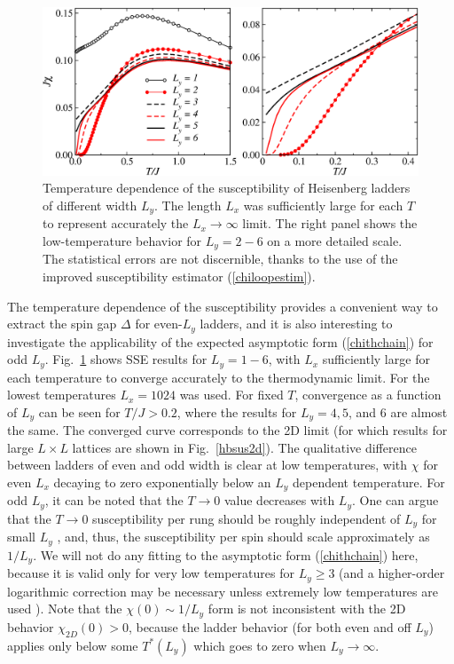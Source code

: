 \documentclass[draft,numberedheadings]{aipproc}
\begin{document}
\begin{figure}
\includegraphics[width=12.5cm, clip]{laddsusc.eps}
\caption{Temperature dependence of the susceptibility of Heisenberg ladders of different width $L_y$. The length $L_x$ was sufficiently large
for each $T$ to represent accurately the $L_x\to \infty$ limit. The right panel shows the low-temperature behavior for $L_y=2-6$ on a more
detailed scale. The statistical errors are not discernible, thanks to the use of the improved susceptibility estimator (\ref{chiloopestim}).}
\label{laddsusc}
\end{figure}

The temperature dependence of the susceptibility provides a convenient way to extract the spin gap $\Delta$ for even-$L_y$ ladders, and it is also 
interesting to investigate the applicability of the expected asymptotic form (\ref{chithchain}) for odd $L_y$. Fig.~\ref{laddsusc} shows SSE results for $L_y=1-6$, 
with $L_x$ sufficiently large for each temperature to converge accurately to the thermodynamic limit. For the lowest temperatures $L_x=1024$ was used. For fixed $T$, 
convergence as a function of $L_y$ can be seen for $T/J>0.2$, where the results for $L_y=4,5$, and $6$ are almost the same. The converged curve corresponds 
to the 2D limit (for which results for large $L\times L$ lattices are shown in Fig.~\ref{hbsus2d}). The qualitative difference between ladders of 
even and odd width is clear at low temperatures, with $\chi$ for even $L_x$ decaying to zero exponentially below an $L_y$ dependent temperature. For odd
$L_y$, it can be noted that the $T\to 0$ value decreases with $L_y$. One can argue that the $T\to 0$ susceptibility per rung should be roughly independent of 
$L_y$ for small $L_y$ \cite{frischmuth96}, and, thus, the susceptibility per spin should scale approximately as $1/L_y$. We will not do any fitting to the asymptotic 
form (\ref{chithchain}) here, because it is valid only for very low temperatures for $L_y\ge 3$ (and a higher-order logarithmic correction may be necessary 
unless extremely low temperatures are used \cite{frischmuth96}). Note that the $\chi(0) \sim 1/L_y$ form is not inconsistent with the 2D behavior
$\chi_{2D}(0)>0$, because the ladder behavior (for both even and off $L_y$) applies only below some $T^*(L_y)$ which goes to zero when $L_y \to \infty$.
\end{document}
